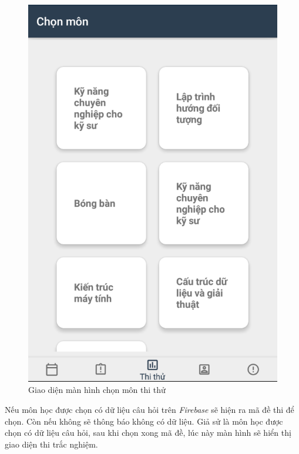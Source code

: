 \documentclass[a4paper]{article}
\begin{document}
\begin{figure}[H]
    \centering
    \includegraphics[scale=.3]{select_sub_ui.png}
    \caption{Giao diện màn hình chọn môn thi thử}
    \label{fig:sel_sub}
\end{figure}
Nếu môn học được chọn có dữ liệu câu hỏi trên \textit{Firebase} sẽ hiện ra mã đề thi để chọn. Còn nếu không sẽ thông báo không có dữ liệu. Giả sử là môn học được chọn có dữ liệu câu hỏi, sau khi chọn xong mã đề, lúc này màn hình sẽ hiển thị giao diện thi trắc nghiệm.
\end{document}
